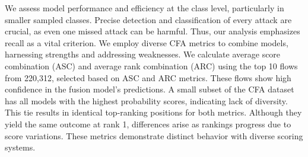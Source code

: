 

We assess model performance and efficiency at the class level, particularly in smaller sampled classes. Precise detection and classification of every attack are crucial, as even one missed attack can be harmful. Thus, our analysis emphasizes recall as a vital criterion. We employ diverse CFA metrics to combine models, harnessing strengths and addressing weaknesses. We calculate average score combination (ASC) and average rank combination (ARC) using the top 10 flows from 220,312, selected based on ASC and ARC metrics. These flows show high confidence in the fusion model's predictions. A small subset of the CFA dataset has all models with the highest probability scores, indicating lack of diversity. This tie results in identical top-ranking positions for both metrics. %
Although they yield the same outcome at rank 1, differences arise as rankings progress due to score variations. These metrics demonstrate distinct behavior with diverse scoring systems.

